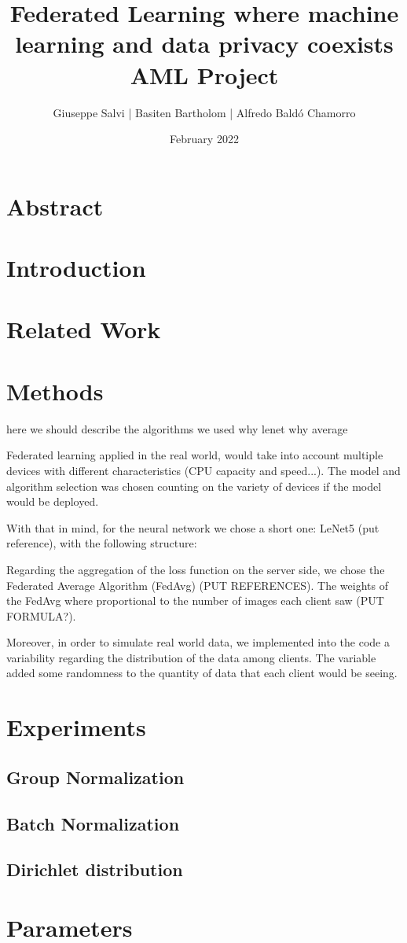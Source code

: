 \documentclass[twocolumn]{article}
\title{Federated Learning where machine learning and data privacy coexists
\\AML Project}
\author{Giuseppe Salvi |
Basiten Bartholom |
Alfredo Baldó Chamorro}
\date{February 2022}
\begin{document}
\maketitle

\section{Abstract}
\section{Introduction} %
\section{Related Work} %
\section{Methods} %
here we should describe the algorithms we used
why lenet why average

Federated learning applied in the real world, would take into account multiple devices with different characteristics (CPU capacity and speed...). The model and algorithm selection was chosen counting on the variety of devices if the model would be deployed. 

With that in mind, for the neural network we chose a short one: LeNet5 (put reference), with the following structure:

Regarding the aggregation of the loss function on the server side, we chose the Federated Average Algorithm (FedAvg)  (PUT REFERENCES). The weights of the FedAvg where proportional to the number of images each client saw (PUT FORMULA?).

Moreover, in order to simulate real world data, we implemented into the code a variability regarding the distribution of the data among clients. The variable added some randomness to the quantity of data that each client would be seeing. 

\section{Experiments} %
\subsection{Group Normalization}
\subsection{Batch Normalization}
\subsection{Dirichlet distribution}
\section{Parameters}
\end{document}
